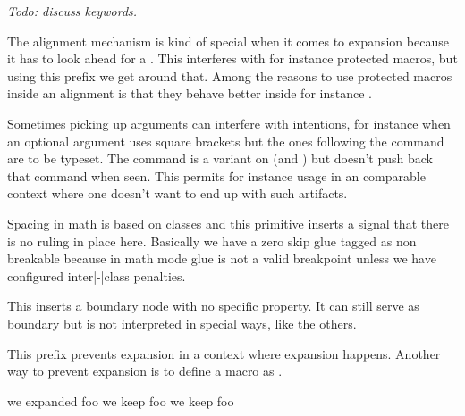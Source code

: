 {\em Todo: discuss keywords.}

\stopoldprimitive

\startnewprimitive[title={\prm {noaligned}}]

The alignment mechanism is kind of special when it comes to expansion because it
has to look ahead for a . This interferes with for instance
protected macros, but using this prefix we get around that. Among the reasons to
use protected macros inside an alignment is that they behave better inside for
instance .

\stopnewprimitive

\startnewprimitive[title={\prm {noarguments}}]

Sometimes picking up arguments can interfere with intentions, for instance when
an optional argument uses square brackets but the ones following the command are
to be typeset. The  command is a variant on  (and
) but doesn't push back that command when seen. This permits for
instance usage in an  comparable context where one doesn't want to end
up with such artifacts.

\stopnewprimitive

\startnewprimitive[title={\prm {noatomruling}}]

Spacing in math is based on classes and this primitive inserts a signal that
there is no ruling in place here. Basically we have a zero skip glue tagged as
non breakable because in math mode glue is not a valid breakpoint unless we have
configured inter|-|class penalties.

\stopnewprimitive

\startnewprimitive[title={\prm {noboundary}}]

This inserts a boundary node with no specific property. It can still serve as
boundary but is not interpreted in special ways, like the others.

\stopnewprimitive

\startoldprimitive[title={\prm {noexpand}}]

This prefix prevents expansion in a context where expansion happens. Another way
to prevent expansion is to define a macro as .

\startbuffer
          \def\foo{foo} \edef\oof{we expanded      \foo} \meaning\oof
          \def\foo{foo} \edef\oof{we keep \noexpand\foo} \meaning\oof
\protected\def\foo{foo} \edef\oof{we keep          \foo} \meaning\oof
\stopbuffer

